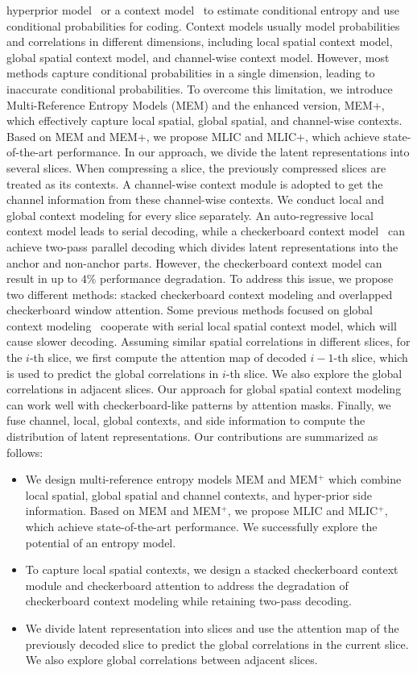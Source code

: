 \documentclass[sigconf]{acmart}
\begin{document}
hyperprior model~\cite{balle2018variational} or a context model~\cite{DBLP:conf/nips/MinnenBT18}
to estimate conditional entropy and use conditional probabilities for coding.
Context models usually model probabilities and correlations in different dimensions,
including local spatial context model,
global spatial context model, and channel-wise context model. However,
most methods capture conditional probabilities in a single dimension,
leading to inaccurate conditional probabilities.
To overcome this limitation,
we introduce Multi-Reference Entropy Models (MEM) and  the enhanced version, MEM+,
which effectively capture local spatial, global spatial, and channel-wise contexts.
Based on MEM and MEM+, we propose MLIC and MLIC+,
which achieve state-of-the-art performance. In our approach, we divide the latent representations into several slices.
When compressing a slice, the previously compressed slices
are treated as its contexts. A channel-wise context module is adopted to
get the channel information from these channel-wise contexts.
We conduct local and global context modeling for every slice separately.
An auto-regressive local context model leads to serial decoding,
while a checkerboard context model~\cite{He_2021_CVPR} can achieve two-pass parallel
decoding which divides latent representations into the anchor and non-anchor parts.
However, the checkerboard context model can result in up to $4\%$ performance degradation.
To address this issue, we propose two different methods:
stacked checkerboard context modeling and overlapped checkerboard window attention.
Some previous methods focused on global context modeling~\cite{DBLP:conf/iclr/QianTSLLSHJ21,
DBLP:journals/tcsv/GuoZFC22} cooperate with serial local spatial context model,
which will cause slower decoding. Assuming similar
spatial correlations in different slices, for the $i$-th slice,
we first compute the attention map of decoded $i-1$-th slice,
which is used to predict the global correlations in $i$-th slice.
We also explore the global correlations in adjacent slices.
Our approach for global spatial context modeling can work well with
checkerboard-like patterns by attention masks. Finally, we fuse channel,
local, global contexts, and side information to compute the
distribution of latent representations.
Our contributions are summarized as follows:
\begin{itemize}
\item We design multi-reference entropy models MEM and MEM$^+$ which
combine local spatial, global spatial and channel contexts, and
hyper-prior side information. Based on MEM and MEM$^+$,
we propose MLIC and MLIC$^+$, which achieve state-of-the-art performance.
We successfully explore the potential of an entropy model.
\item To capture local spatial contexts, we design a stacked
checkerboard context module and checkerboard attention to
address the degradation of checkerboard context modeling while retaining two-pass decoding.
\item We divide latent representation into slices and use the attention map of the
previously decoded slice to predict the global correlations in the current slice.
We also explore global correlations between adjacent slices.
\end{itemize}
\end{document}
